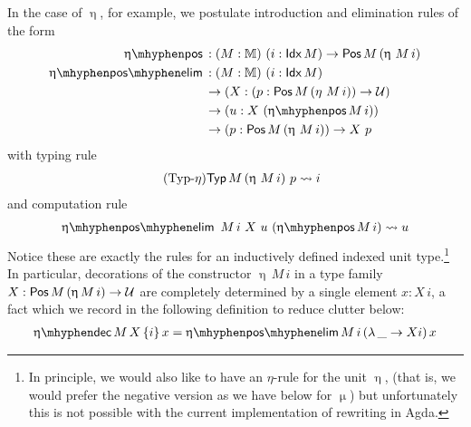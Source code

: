 In the case of $\upeta$, for example, we postulate introduction and
elimination rules of the form
\begin{align*}
  \etapos &: (M : \MM)\ (i : \Idx M) \to \Pos M\, (\upeta\ M\, i)\\
  \etaposelim &: (M : \MM)\ (i : \Idx M) \\
              &\to (X : (p : \Pos M\, (\eta\ M\, i)) \to \UU)\\ 
              &\to (u : X\ (\etapos M\, i)) \\
          &\to (p : \Pos M\, (\upeta\ M\, i)) \to X\ p
\end{align*}
with typing rule
\begin{equation}
  \label{rewrite:etaTyp}
  \tag{Typ-$\eta$}
  \begin{aligned}
    \mathsf{Typ}\, M\, (\upeta\ M\, i)\ p & \leadsto i 
  \end{aligned}
\end{equation}
and computation rule
\begin{align*}
  \etaposelim\ M\, i\ X\ u\ (\etapos M\, i) &\leadsto u \\
\end{align*}
Notice these are exactly the rules for an inductively defined indexed unit
type.\footnote{In principle, we would also like to have an
  $\eta$-rule for the unit $\upeta$, (that is, we would prefer the
  negative version as we have below for $\upmu$) but unfortunately
  this is not possible with the current implementation of rewriting in
  Agda.}  In particular, decorations of the constructor $\upeta\, M\, i$
in a type family $X : \mathsf{Pos}\, M\, (\upeta\, M\, i) \to \mathcal{U}$ are completely determined
by a single element $x : X\, i$, a fact which we record in the following
definition to reduce clutter below:
\begin{align*}
  \etadec M\, X\, \{i\}\, x = \etaposelim M\, i\, (\lambda\, \_ \to X i)\, x 
\end{align*}

